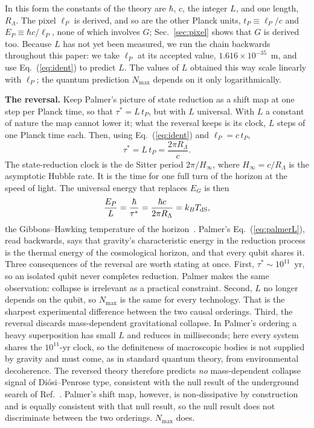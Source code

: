 \documentclass[aps,prd,twocolumn,superscriptaddress,nofootinbib,showkeys]{revtex4-2}
\begin{document}
In this form the constants of the theory are $\hbar$, $c$, the integer $L$, and one length, $R_\Lambda$. The pixel $\ell_P$ is derived, and so are the other Planck units, $t_P \equiv \ell_P/c$ and $E_P \equiv \hbar c/\ell_P$, none of which involves $G$; Sec.~\ref{sec:pixel} shows that $G$ is derived too. Because $L$ has not yet been measured, we run the chain backwards throughout this paper: we take $\ell_P$ at its accepted value, $1.616\times10^{-35}$~m, and use Eq.~(\ref{eq:ident}) to predict $L$. The values of $L$ obtained this way scale linearly with $\ell_P$; the quantum prediction $N_{\max}$ depends on it only logarithmically.

\textbf{The reversal.} Keep Palmer's picture of state reduction as a shift map at one step per Planck time, so that $\tau^* = L\,t_P$, but with $L$ universal. With $L$ a constant of nature the map cannot lower it; what the reversal keeps is its clock, $L$ steps of one Planck time each. Then, using Eq.~(\ref{eq:ident}) and $\ell_P = c\,t_P$,
\begin{equation}
\tau^* = L\,t_P = \frac{2\pi R_\Lambda}{c} .
\label{eq:clock}
\end{equation}
The state-reduction clock is the de Sitter period $2\pi/H_\infty$, where $H_\infty = c/R_\Lambda$ is the asymptotic Hubble rate. It is the time for one full turn of the horizon at the speed of light. The universal energy that replaces $E_G$ is then
\begin{equation}
\frac{E_P}{L} = \frac{\hbar}{\tau^*} = \frac{\hbar c}{2\pi R_\Lambda} = k_B T_{\rm dS},
\label{eq:energy}
\end{equation}
the Gibbons--Hawking temperature of the horizon~\cite{gibbons1977}. Palmer's Eq.~(\ref{eq:palmerL}), read backwards, says that gravity's characteristic energy in the reduction process is the thermal energy of the cosmological horizon, and that every qubit shares it. Three consequences of the reversal are worth stating at once. First, $\tau^*\sim10^{11}$~yr, so an isolated qubit never completes reduction. Palmer makes the same observation: collapse is irrelevant as a practical constraint. Second, $L$ no longer depends on the qubit, so $N_{\max}$ is the same for every technology. That is the sharpest experimental difference between the two causal orderings. Third, the reversal discards mass-dependent gravitational collapse. In Palmer's ordering a heavy superposition has small $L$ and reduces in milliseconds; here every system shares the $10^{11}$-yr clock, so the definiteness of macroscopic bodies is not supplied by gravity and must come, as in standard quantum theory, from environmental decoherence. The reversed theory therefore predicts \emph{no} mass-dependent collapse signal of Di\'osi--Penrose type, consistent with the null result of the underground search of Ref.~\cite{donadi2021}. Palmer's shift map, however, is non-dissipative by construction and is equally consistent with that null result, so the null result does not discriminate between the two orderings. $N_{\max}$ does.
\end{document}
